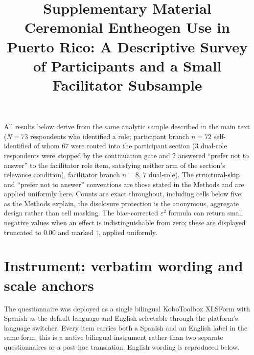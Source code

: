 \documentclass[12pt]{article}
\title{Supplementary Material\\
\large Ceremonial Entheogen Use in Puerto Rico: A Descriptive Survey of Participants and a Small
Facilitator Subsample}
\date{}
\begin{document}
\maketitle

\noindent
All results below derive from the same analytic sample described in the main text ($N=73$ respondents who
identified a role; participant branch $n=72$ self-identified of whom 67 were routed into the participant section
(3 dual-role respondents were stopped by the continuation gate and 2 answered ``prefer not to answer''
to the facilitator role item, satisfying neither arm of the section's relevance condition), facilitator branch $n=8$, 7 dual-role). The structural-skip and ``prefer not to answer'' conventions
are those stated in the Methods and are applied uniformly here. Counts are exact throughout, including
cells below five: as the Methods explain, the disclosure protection is the anonymous, aggregate design
rather than cell masking. The bias-corrected $\varepsilon^2$ formula can return small negative values when
an effect is indistinguishable from zero; these are displayed truncated to 0.00 and marked $\dagger$,
applied uniformly.

\section{Instrument: verbatim wording and scale anchors}

The questionnaire was deployed as a single bilingual KoboToolbox XLSForm with Spanish as the default
language and English selectable through the platform's language switcher. Every item carries both a Spanish
and an English label in the same form; this is a native bilingual instrument rather than two separate
questionnaires or a post-hoc translation. English wording is reproduced below.
\end{document}
